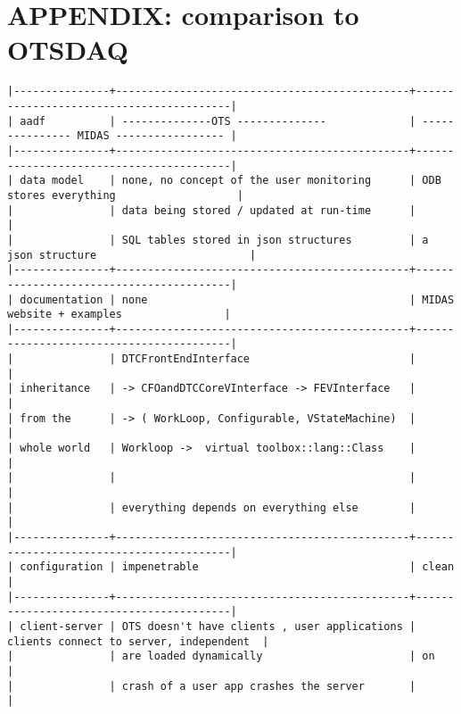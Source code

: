 \section{APPENDIX: comparison to OTSDAQ}

\tiny{
  \begin{verbatim}
|---------------+----------------------------------------------+-----------------------------------------|
| aadf          | --------------OTS --------------             | --------------- MIDAS ----------------- |
|---------------+----------------------------------------------+-----------------------------------------|
| data model    | none, no concept of the user monitoring      | ODB stores everything                   |
|               | data being stored / updated at run-time      |                                         |
|               | SQL tables stored in json structures         | a json structure                        |
|---------------+----------------------------------------------+-----------------------------------------|
| documentation | none                                         | MIDAS website + examples                |
|---------------+----------------------------------------------+-----------------------------------------|
|               | DTCFrontEndInterface                         |                                         |
| inheritance   | -> CFOandDTCCoreVInterface -> FEVInterface   |                                         |
| from the      | -> ( WorkLoop, Configurable, VStateMachine)  |                                         |
| whole world   | Workloop ->  virtual toolbox::lang::Class    |                                         |
|               |                                              |                                         |
|               | everything depends on everything else        |                                         |
|---------------+----------------------------------------------+-----------------------------------------|
| configuration | impenetrable                                 | clean                                   |
|---------------+----------------------------------------------+-----------------------------------------|
| client-server | OTS doesn't have clients , user applications | clients connect to server, independent  |
|               | are loaded dynamically                       | on                                      |
|               | crash of a user app crashes the server       |                                         |

\end{verbatim}}
